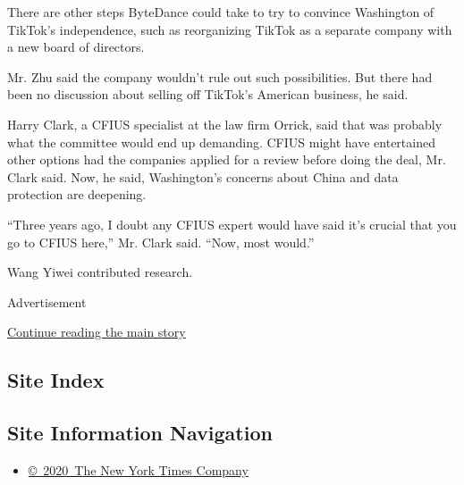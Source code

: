 There are other steps ByteDance could take to try to convince Washington
of TikTok's independence, such as reorganizing TikTok as a separate
company with a new board of directors.

Mr. Zhu said the company wouldn't rule out such possibilities. But there
had been no discussion about selling off TikTok's American business, he
said.

Harry Clark, a CFIUS specialist at the law firm Orrick, said that was
probably what the committee would end up demanding. CFIUS might have
entertained other options had the companies applied for a review before
doing the deal, Mr. Clark said. Now, he said, Washington's concerns
about China and data protection are deepening.

``Three years ago, I doubt any CFIUS expert would have said it's crucial
that you go to CFIUS here,'' Mr. Clark said. ``Now, most would.''

Wang Yiwei contributed research.

Advertisement

\protect\hyperlink{after-bottom}{Continue reading the main story}

\hypertarget{site-index}{%
\subsection{Site Index}\label{site-index}}

\hypertarget{site-information-navigation}{%
\subsection{Site Information
Navigation}\label{site-information-navigation}}

\begin{itemize}
\tightlist
\item
  \href{https://help.nytimes3xbfgragh.onion/hc/en-us/articles/115014792127-Copyright-notice}{©~2020~The
  New York Times Company}
\end{itemize}

